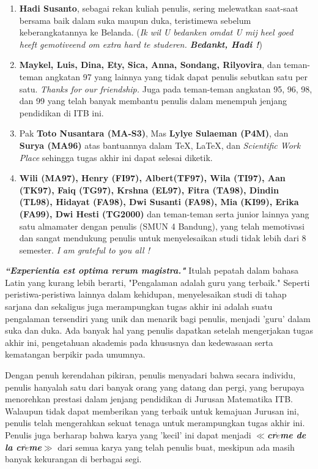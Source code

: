 \documentclass[12pt,a4paper]{report}
\begin{document}
\begin{enumerate}
\item[\textbf{7.}]  \textbf{Hadi Susanto}, sebagai rekan kuliah
penulis, sering melewatkan saat-saat bersama baik dalam suka
maupun duka, teristimewa sebelum keberangkatannya ke Belanda.
\newline (\textsl{Ik wil U bedanken omdat U mij heel goed heeft
gemotiveend om extra hard te studeren. \textbf{Bedankt, Hadi !}})

\item[\textbf{8.}] \textbf{Maykel, Luis, Dina, Ety, Sica, Anna, Sondang,
Rilyovira}, dan teman-teman angkatan 97 yang lainnya yang tidak
dapat penulis sebutkan satu per satu. \textit{Thanks for our
friendship.} Juga pada teman-teman angkatan 95, 96, 98, dan 99
yang telah banyak membantu penulis dalam menempuh jenjang
pendidikan di ITB ini.

\item[\textbf{9.}] Pak \textbf{Toto Nusantara (MA-S3)}, Mas
\textbf{Lylye Sulaeman (P4M)}, dan \textbf{Surya (MA96)} atas
bantuannya dalam \TeX, \LaTeX, dan \textit{Scientific Work Place}
sehingga tugas akhir ini dapat selesai diketik.

\item[\textbf{10.}] \textbf{Wili (MA97), Henry (FI97),
Albert(TF97), Wila (TI97), Aan (TK97), Faiq (TG97), Krshna (EL97),
Fitra (TA98), Dindin (TL98), Hidayat (FA98), Dwi Susanti (FA98),
Mia (KI99), Erika (FA99), Dwi Hesti (TG2000)} dan teman-teman
serta junior lainnya yang satu almamater dengan penulis (SMUN 4
Bandung), yang telah memotivasi dan sangat mendukung penulis untuk
menyelesaikan studi tidak lebih dari 8 semester. \textsl{I am
grateful to you all !}
\end{enumerate}

\textsl{\textbf{``Experientia est optima rerum magistra."}} Itulah
pepatah dalam bahasa Latin yang kurang lebih berarti, "Pengalaman
adalah guru yang terbaik." Seperti peristiwa-peristiwa lainnya
dalam kehidupan, menyelesaikan studi di tahap sarjana dan
sekaligus juga merampungkan tugas akhir ini adalah suatu
pengalaman tersendiri yang unik dan menarik bagi penulis, menjadi
'guru' dalam suka dan duka. Ada banyak hal yang penulis dapatkan
setelah mengerjakan tugas akhir ini, pengetahuan akademis pada
khususnya dan kedewasaan serta kematangan berpikir pada umumnya.

Dengan penuh kerendahan pikiran, penulis menyadari bahwa secara
individu, penulis hanyalah satu dari banyak orang yang datang dan
pergi, yang berupaya menorehkan prestasi dalam jenjang pendidikan
di Jurusan Matematika ITB. Walaupun tidak dapat memberikan yang
terbaik untuk kemajuan Jurusan ini, penulis telah mengerahkan
sekuat tenaga untuk merampungkan tugas akhir ini.
Penulis juga berharap bahwa karya yang 'kecil' ini dapat menjadi \textbf{%
\textit{\mbox{\boldmath $\ll$}cr\mbox{\boldmath $\grave{e}$}me de
la cr\mbox{\boldmath $\grave{e}$}me\mbox{\boldmath$\gg$}}} dari
semua karya yang telah penulis buat, meskipun ada masih banyak
kekurangan di berbagai segi.
\end{document}
